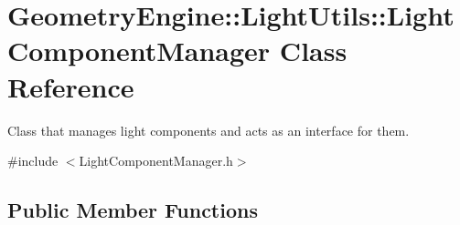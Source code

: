 \hypertarget{class_geometry_engine_1_1_light_utils_1_1_light_component_manager}{}\section{Geometry\+Engine\+::Light\+Utils\+::Light\+Component\+Manager Class Reference}
\label{class_geometry_engine_1_1_light_utils_1_1_light_component_manager}


Class that manages light components and acts as an interface for them.  




{\ttfamily \#include $<$Light\+Component\+Manager.\+h$>$}

\subsection*{Public Member Functions}
